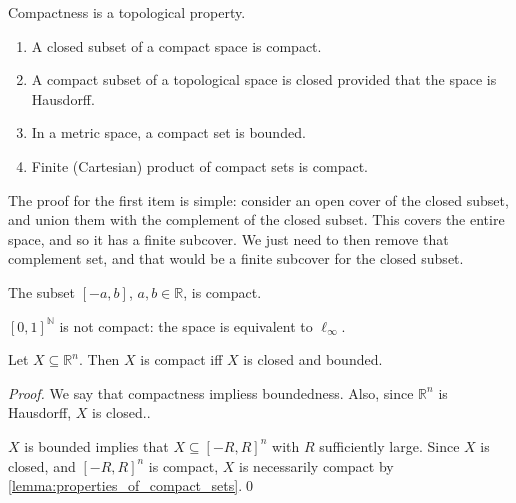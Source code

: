 \documentclass[notoc,notitlepage]{tufte-book}
\begin{document}
\begin{note}
  Compactness is a topological property.
\end{note}

\begin{lemma}\label{lemma:properties_of_compact_sets}
  \begin{enumerate}
    \item A closed subset of a compact space is compact.
    \item A compact subset of a topological space is closed provided that the
      space is Hausdorff.
    \item In a metric space, a compact set is bounded.
    \item Finite (Cartesian) product of compact sets is compact.
  \end{enumerate}
\end{lemma}

The proof for the first item is simple: consider an open cover of the closed subset,
and union them with the complement of the closed subset. This covers the entire space,
and so it has a finite subcover. We just need to then remove that complement set, and
that would be a finite subcover for the closed subset.

\begin{eg}
  The subset $[-a, b]$, $a, b \in \mathbb{R}$, is compact.
\end{eg}

\begin{eg}
  $[0, 1]^{\mathbb{N}}$ is not compact: the space is equivalent to $\ell_\infty$.
\end{eg}

\begin{thm}\label{thm:heine_borel}
  Let $X \subseteq \mathbb{R}^n$. Then $X$ is compact iff $X$ is closed and bounded.
\end{thm}

\begin{proof}
  \hlbnoted{$(\implies)$} We say that compactness impliess boundedness. Also, since
  $\mathbb{R}^n$ is Hausdorff, $X$ is closed..

  \noindent
  \hlbnoted{$(\impliedby)$} $X$ is bounded implies that $X \subseteq [-R, R]^n$ with $R$
  sufficiently large. Since $X$ is closed, and $[-R, R]^n$ is compact, $X$ is necessarily
  compact by \cref{lemma:properties_of_compact_sets}.\qed\
\end{proof}
\end{document}
